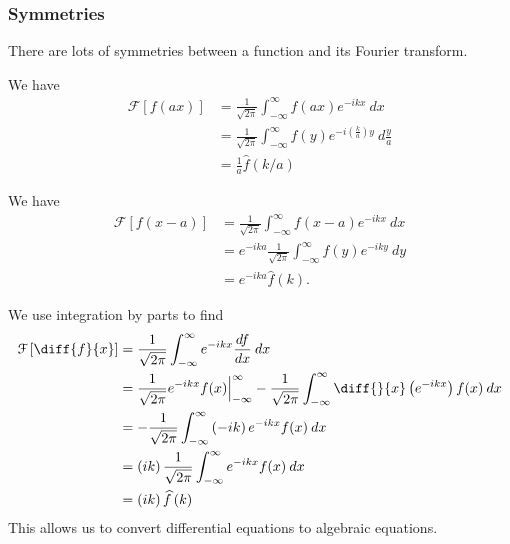 \documentclass[10pt]{mypackage}
\begin{document}
\subsubsection{Symmetries}%

There are lots of symmetries between a function and its Fourier transform.
\begin{example}[Scaling]
  We have
  \begin{align*}
    \mathcal{F}\left[f(ax)\right] &= \frac{1}{\sqrt{2\pi}}\int_{-\infty}^{\infty} f(ax)e^{-ikx}\:dx\\
                                  &= \frac{1}{\sqrt{2\pi}}\int_{-\infty}^{\infty} f(y)e^{-i\left(\frac{k}{a}\right)y}\:d\frac{y}{a}\tag*{$y = ax$}\\
                                  &= \frac{1}{a}\widehat{f}\left(k/a\right)
  \end{align*}
\end{example}
\begin{example}[Translation]
  We have
  \begin{align*}
    \mathcal{F}\left[f(x-a)\right] &= \frac{1}{\sqrt{2\pi}}\int_{-\infty}^{\infty} f\left(x-a\right)e^{-ikx}\:dx\\
                                   &= e^{-ika}\frac{1}{\sqrt{2\pi}}\int_{-\infty}^{\infty} f\left(y\right)e^{-iky}\:dy\\
                                   &= e^{-ika}\widehat{f}(k).
  \end{align*}
\end{example}
\begin{example}
  We use integration by parts to find
  \begin{align*}
  \mathcal{F}\left[\diff{f}{x}\right] &= \frac{1}{\sqrt{2\pi}}\int_{-\infty}^{\infty} e^{-ikx}\frac{df}{dx}\:dx\\
                                      &= \frac{1}{\sqrt{2\pi}}e^{-ikx}f(x)\Bigr\vert_{-\infty}^{\infty} - \frac{1}{\sqrt{2\pi}}\int_{-\infty}^{\infty}\diff{}{x}\left(e^{-ikx}\right)f(x) \:dx\\
                                      &= -\frac{1}{\sqrt{2\pi}}\int_{-\infty}^{\infty} \left(-ik\right)e^{-ikx}f(x)\:dx\\
                                      &= \left(ik\right)\frac{1}{\sqrt{2\pi}}\int_{-\infty}^{\infty} e^{-ikx}f(x)\:dx\\
                                      &= \left(ik\right) \widehat{f}\left(k\right)
  \end{align*}
  This allows us to convert differential equations to algebraic equations.
\end{example}
\end{document}
